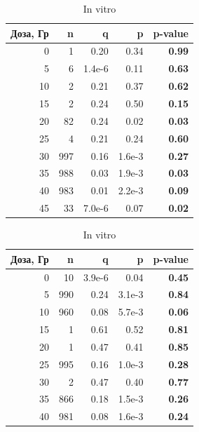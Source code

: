 \documentclass[12pt, specialist, subf, substylefile = spbu.rtx]{disser}
\begin{document}
	\begin{table}[ht]
		\centering
		\caption*{Оценки параметров и значимости критерия хи-квадрат биномиально-логарифмического распределения.}
		\small
		\begin{minipage}{0.48\textwidth}
			\centering
			\caption{In vivo}
			
			\begin{tabular}{rrrrr}
				\hline
				Доза, Гр & n & q & p & \textbf{p-value} \\ 
				\hline
				0 & 1 & 0.20 & 0.34 & \textbf{0.99} \\ 
				5 & 6 & 1.4e-6 & 0.11 & \textbf{0.63} \\ 
				10 & 2 & 0.21 & 0.37 & \textbf{0.62} \\ 
				15 & 2 & 0.24 & 0.50 & \textbf{0.15} \\ 
				20 & 82 & 0.24 & 0.02 & \textbf{0.03} \\ 
				25 & 4 & 0.21 & 0.24 & \textbf{0.60} \\ 
				30 & 997 & 0.16 & 1.6e-3 & \textbf{0.27} \\ 
				35 & 988 & 0.03 & 1.9e-3 & \textbf{0.03} \\ 
				40 & 983 & 0.01 & 2.2e-3 & \textbf{0.09} \\
				45 & 33 & 7.0e-6 & 0.07 & \textbf{0.02} \\ 
				\hline
			\end{tabular}
			\label{tab:binomlogvivo}
		\end{minipage}
		\hfill
		\begin{minipage}{0.48\textwidth}
			\centering
			\caption{In vitro}
			
			\begin{tabular}{rrrrr}
				\hline
				Доза, Гр & n & q & p & \textbf{p-value} \\ 
				\hline
				0 & 10 & 3.9e-6 & 0.04 & \textbf{0.45} \\ 
				5 & 990 & 0.24 & 3.1e-3 & \textbf{0.84} \\ 
				10 & 960 & 0.08 & 5.7e-3 & \textbf{0.06} \\ 
				15 & 1 & 0.61 & 0.52 & \textbf{0.81} \\ 
				20 & 1 & 0.47 & 0.41 & \textbf{0.85} \\ 
				25 & 995 & 0.16 & 1.0e-3 & \textbf{0.28} \\ 
				30 & 2 & 0.47 & 0.40 & \textbf{0.77} \\ 
				35 & 866 & 0.18 & 1.5e-3 & \textbf{0.26} \\ 
				40 & 981 & 0.08 & 1.6e-3 & \textbf{0.24} \\
				\hline
			\end{tabular}
			\label{tab:binomlogvitro}
		\end{minipage}
		\label{tab:binomlog}
	\end{table}
\end{document}
